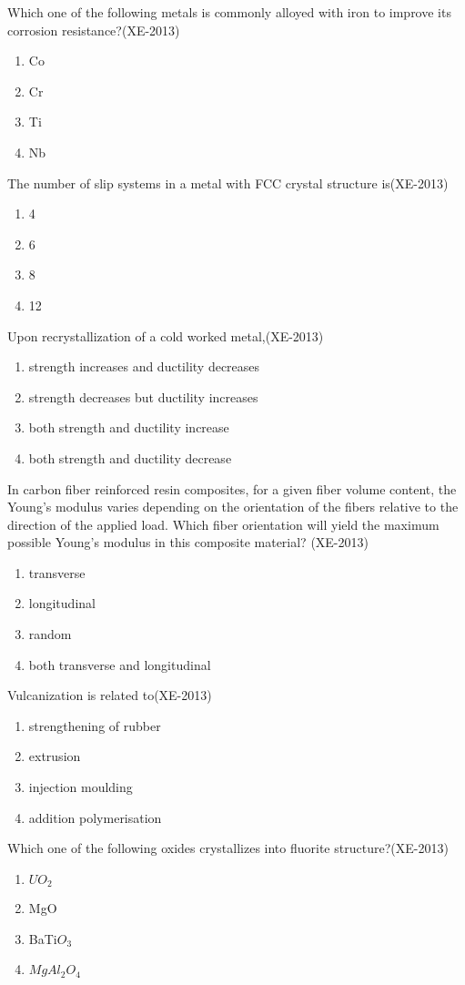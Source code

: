 \item Which one of the following metals is commonly alloyed with iron to improve its corrosion resistance?\hfill(XE-2013)
\begin{enumerate}
    \item Co
    \item Cr
    \item Ti
    \item Nb
    
\end{enumerate}
\item The number of slip systems in a metal with FCC crystal structure is\hfill(XE-2013)
\begin{enumerate}
    \item 4
    \item 6
    \item 8
    \item 12
\end{enumerate}
\item Upon recrystallization of a cold worked metal,\hfill(XE-2013)
\begin{enumerate}
    \item strength increases and ductility decreases
    \item strength decreases but ductility increases
    \item both strength and ductility increase
    \item both strength and ductility decrease
\end{enumerate}
\item In carbon fiber reinforced resin composites, for a given fiber volume content, the Young's modulus varies depending on the orientation of the fibers relative to the direction of the applied load. Which fiber orientation will yield the maximum possible Young's modulus in this composite material?
\hfill(XE-2013)
\begin{enumerate}
    \item transverse 
    \item longitudinal
    \item random 
    \item both transverse and longitudinal
\end{enumerate}
\item Vulcanization is related to\hfill(XE-2013)
\begin{enumerate}
    \item strengthening of rubber 
    \item extrusion
    \item injection moulding 
    \item addition polymerisation
\end{enumerate}
\item Which one of the following oxides crystallizes into fluorite structure?\hfill(XE-2013)
\begin{enumerate}
    \item $UO_2$
    \item MgO
    \item BaTi$O_3$
    \item $MgAl_2O_4$
\end{enumerate}
